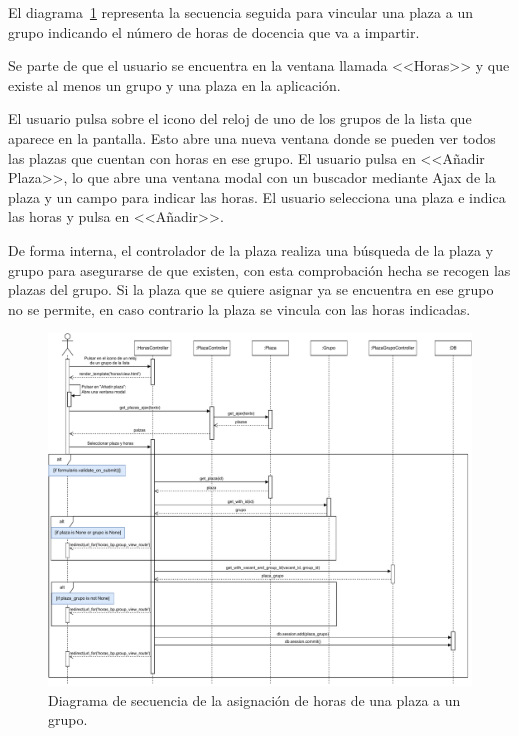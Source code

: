 \begin{itemize}
El diagrama~\ref{DS-asignarHoras} representa la secuencia seguida para vincular una plaza a un grupo indicando el número de horas de docencia que va a impartir.

Se parte de que el usuario se encuentra en la ventana llamada <<Horas>> y que existe al menos un grupo y una plaza en la aplicación. 

El usuario pulsa sobre el icono del reloj de uno de los grupos de la lista que aparece en la pantalla. Esto abre una nueva ventana donde se pueden ver todos las plazas que cuentan con horas en ese grupo. El usuario pulsa en <<Añadir Plaza>>, lo que abre una ventana modal con un buscador mediante Ajax de la plaza y un campo para indicar las horas. El usuario selecciona una plaza e indica las horas y pulsa en <<Añadir>>.

De forma interna, el controlador de la plaza realiza una búsqueda de la plaza y grupo para asegurarse de que existen, con esta comprobación hecha se recogen las plazas del grupo. 
Si la plaza que se quiere asignar ya se encuentra en ese grupo no se permite, en caso contrario la plaza se vincula con las horas indicadas.

\begin{figure}
	\centering
	\includegraphics[width=\textwidth]{../img/Anexos/Diagramas secuencia/DS - asignar horas.pdf}
	\caption{Diagrama de secuencia de la asignación de horas de una plaza a un grupo.}\label{DS-asignarHoras}
\end{figure}

\end{itemize}


